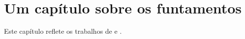 \chapter{Um capítulo sobre os funtamentos}
\label{cap:fundamentos}

Este capítulo reflete os trabalhos de \textcite{knuth} e \textcite{lamport}.

